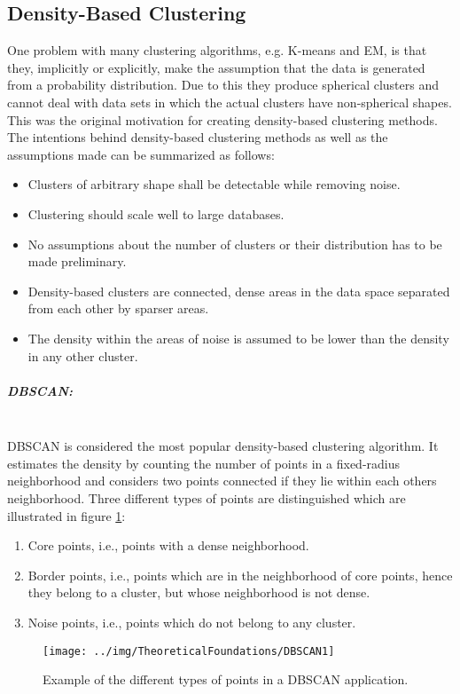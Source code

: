 \subsection{Density-Based Clustering}
\label{subsec:Density-BasedClustering}
One problem with many clustering algorithms, e.g. K-means and EM, is that they, implicitly or explicitly, make the assumption that the data is generated from a probability distribution. Due to this they produce spherical clusters and cannot deal with data sets in which the actual clusters have non-spherical shapes. This was the original motivation for creating density-based clustering methods. The intentions behind density-based clustering methods as well as the assumptions made can be summarized as follows:
\begin{itemize}
\item Clusters of arbitrary shape shall be detectable while removing noise.
\item Clustering should scale well to large databases.
\item No assumptions about the number of clusters or their distribution has to be made preliminary.
\item Density-based clusters are connected, dense areas in the data space separated from each other by sparser areas.
\item The density within the areas of noise is assumed to be lower than the density in any other cluster. 
\end{itemize}

\subparagraph{DBSCAN:}\mbox{}\\
DBSCAN is considered the most popular density-based clustering algorithm. It estimates the density by counting the number of points in a fixed-radius neighborhood and considers two points connected if they lie within each others neighborhood. Three different types of points are distinguished which are illustrated in figure \ref{fig:DBSCAN1}:
\begin{enumerate}
\item Core points, i.e., points with a dense neighborhood.
\item Border points, i.e., points which are in the neighborhood of core points, hence they belong to a cluster, but whose neighborhood is not dense.
\item Noise points, i.e., points which do not belong to any cluster.
\end{enumerate}

\begin{figure}[H]
\centering
\texttt{[image: ../img/TheoreticalFoundations/DBSCAN1]}
\caption{Example of the different types of points in a DBSCAN application.}
\label{fig:DBSCAN1}
\end{figure}

